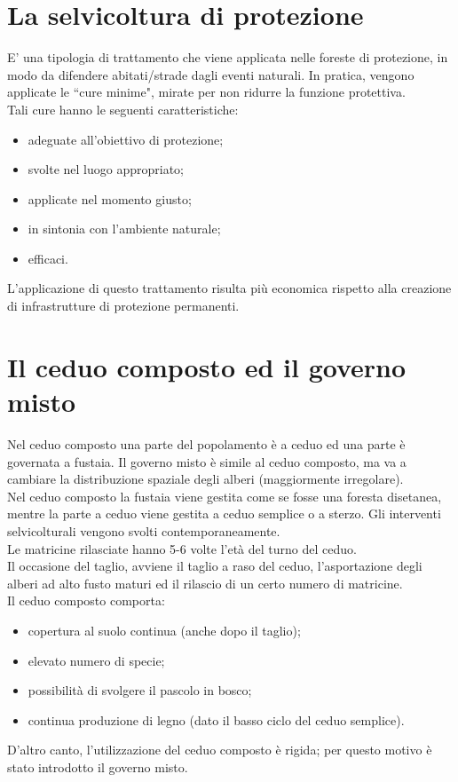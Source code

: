 \documentclass{article}
\begin{document}
\section{La selvicoltura di protezione}
E' una tipologia di trattamento che viene applicata nelle foreste di protezione, in modo da difendere abitati/strade dagli eventi naturali. In pratica, vengono applicate le ``cure minime", mirate per non ridurre la funzione protettiva.\\
Tali cure hanno le seguenti caratteristiche:
\begin{itemize}
    \item adeguate all'obiettivo di protezione;
    \item svolte nel luogo appropriato;
    \item applicate nel momento giusto;
    \item in sintonia con l'ambiente naturale;
    \item efficaci.
\end{itemize}
L'applicazione di questo trattamento risulta più economica rispetto alla creazione di infrastrutture di protezione permanenti.\\
\section{Il ceduo composto ed il governo misto}
Nel ceduo composto una parte del popolamento è a ceduo ed una parte è governata a fustaia. Il governo misto è simile al ceduo composto, ma va a cambiare la distribuzione spaziale degli alberi (maggiormente irregolare).\\
Nel ceduo composto la fustaia viene gestita come se fosse una foresta disetanea, mentre la parte a ceduo viene gestita a ceduo semplice o a sterzo. Gli interventi selvicolturali vengono svolti contemporaneamente.\\
Le matricine rilasciate hanno 5-6 volte l'età del turno del ceduo.\\
Il occasione del taglio, avviene il taglio a raso del ceduo, l'asportazione degli alberi ad alto fusto maturi ed il rilascio di un certo numero di matricine.\\
Il ceduo composto comporta:
\begin{itemize}
    \item copertura al suolo continua (anche dopo il taglio);
    \item elevato numero di specie;
    \item possibilità di svolgere il pascolo in bosco;
    \item continua produzione di legno (dato il basso ciclo del ceduo semplice).
\end{itemize}
D'altro canto, l'utilizzazione del ceduo composto è rigida; per questo motivo è stato introdotto il governo misto.
\end{document}
